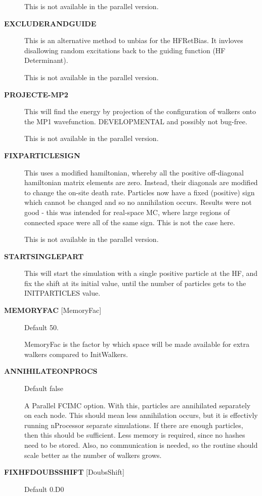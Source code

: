 \documentclass[openany,a4paper,10pt]{manual}
\begin{document}
\begin{description}
This is not available in the parallel version.

\item[\textbf{EXCLUDERANDGUIDE}]
This is an alternative method to unbias for the HFRetBias. It invloves
disallowing random excitations back to the guiding function (HF
Determinant).

This is not available in the parallel version.

\item[\textbf{PROJECTE-MP2}]
This will find the energy by projection of the configuration of walkers
onto the MP1 wavefunction.  DEVELOPMENTAL and possibly not bug-free.

This is not available in the parallel version.

\item[\textbf{FIXPARTICLESIGN}]
This uses a modified hamiltonian, whereby all the positive off-diagonal
hamiltonian matrix elements are zero. Instead, their diagonals are modified
to change the on-site death rate. Particles now have a fixed (positive)
sign which cannot be changed and so no annihilation occurs.  Results were
not good - this was intended for real-space MC, where large regions of connected
space were all of the same sign. This is not the case here.

This is not available in the parallel version.

\item[\textbf{STARTSINGLEPART}]
This will start the simulation with a single positive particle at the HF,
and fix the shift at its initial value, until the number of particles gets
to the INITPARTICLES value.

\item[\textbf{MEMORYFAC} {[}MemoryFac{]}]
Default 50.

MemoryFac is the factor by which space will be made available for extra
walkers compared to InitWalkers.

\item[\textbf{ANNIHILATEONPROCS}]
Default false

A Parallel FCIMC option. With this, particles are annihilated separately on each node.
This should mean less annihilation occurs, but it is effectivly running nProcessor
separate simulations. If there are enough particles, then this should be sufficient.
Less memory is required, since no hashes need to be stored. Also, no communication is
needed, so the routine should scale better as the number of walkers grows.

\item[\textbf{FIXHFDOUBSSHIFT} {[}DoubsShift{]}]
Default 0.D0


\end{description}
\end{document}
